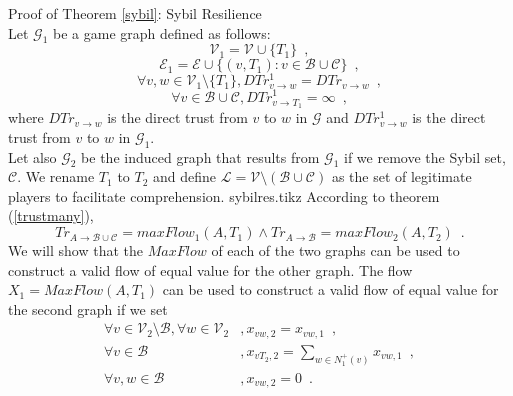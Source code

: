 \begin{sepproof}{Proof of Theorem \ref{sybil}: Sybil Resilience} \ \\
\label{sybilproof}
  Let $\mathcal{G}_1$ be a game graph defined as follows:
  \begin{equation*}
    \mathcal{V}_1 = \mathcal{V} \cup \{T_1\} \enspace,
  \end{equation*}
  \begin{equation*}
    \mathcal{E}_1 = \mathcal{E} \cup \{(v, T_1) : v \in \mathcal{B} \cup \mathcal{C}\} \enspace,
  \end{equation*}
  \begin{equation*}
    \forall v,w \in \mathcal{V}_1 \setminus \{T_1\}, DTr^1_{v \rightarrow w} = DTr_{v \rightarrow w} \enspace,
  \end{equation*}
  \begin{equation*}
    \forall v \in \mathcal{B} \cup \mathcal{C}, DTr^1_{v \rightarrow T_1} = \infty \enspace,
  \end{equation*}
  where $DTr_{v \rightarrow w}$ is the direct trust from $v$ to $w$ in $\mathcal{G}$ and $DTr^1_{v \rightarrow w}$ is
  the direct trust from $v$ to $w$ in $\mathcal{G}_1$. \\
  Let also $\mathcal{G}_2$ be the induced graph that results from $\mathcal{G}_1$ if we remove the Sybil set,
  $\mathcal{C}$. We rename $T_1$ to $T_2$ and define $\mathcal{L} = \mathcal{V} \setminus \left(\mathcal{B} \cup
  \mathcal{C}\right)$ as the set of legitimate players to facilitate comprehension.
  {sybilres.tikz}
  According to theorem (\ref{trustmany}),
  \begin{equation}
  \label{trmaxflow}
    Tr_{A \rightarrow \mathcal{B} \cup \mathcal{C}} = maxFlow_1\left(A, T_1\right) \wedge
    Tr_{A \rightarrow \mathcal{B}} = maxFlow_2\left(A, T_2\right) \enspace.
  \end{equation}
  We will show that the $MaxFlow$ of each of the two graphs can be used to construct a valid flow of equal value for the
  other graph. The flow $X_1 = MaxFlow\left(A, T_1\right)$ can be used to construct a valid flow of equal value for the
  second graph if we set
  \begin{align*}
    \forall v \in \mathcal{V}_2 \setminus \mathcal{B}, \forall w \in \mathcal{V}_2&, x_{vw,2} = x_{vw,1} \enspace, \\
    \forall v \in \mathcal{B}&, x_{vT_2,2} = \sum\limits_{w \in N^{+}_1\left(v\right)}x_{vw,1} \enspace, \\
    \forall v,w \in \mathcal{B}&, x_{vw,2} = 0 \enspace.

\end{align*}
\end{sepproof}
